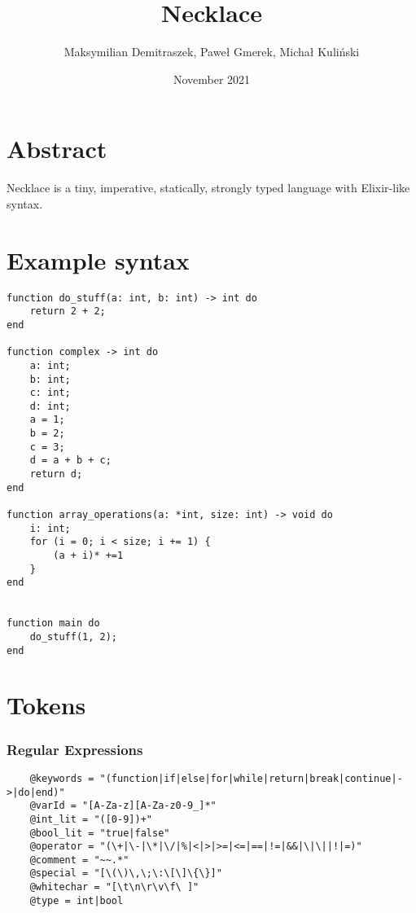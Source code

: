 \documentclass{article}
\title{Necklace}
\author{Maksymilian Demitraszek, Paweł Gmerek, Michał Kuliński}
\date{November 2021}
\begin{document}
\maketitle
\section{Abstract}
Necklace is a tiny, imperative, statically, strongly typed language with Elixir-like syntax.

\section{Example syntax}

\begin{verbatim}
function do_stuff(a: int, b: int) -> int do
    return 2 + 2;
end

function complex -> int do
    a: int;
    b: int;
    c: int;
    d: int;
    a = 1;
    b = 2;
    c = 3;
    d = a + b + c;
    return d;
end

function array_operations(a: *int, size: int) -> void do
    i: int;
    for (i = 0; i < size; i += 1) {
        (a + i)* +=1
    }
end


function main do
    do_stuff(1, 2);
end
\end{verbatim}

\section{Tokens}
\subsubsection{Regular Expressions}
\begin{verbatim}
    @keywords = "(function|if|else|for|while|return|break|continue|->|do|end)"
    @varId = "[A-Za-z][A-Za-z0-9_]*"
    @int_lit = "([0-9])+" 
    @bool_lit = "true|false"
    @operator = "(\+|\-|\*|\/|%|<|>|>=|<=|==|!=|&&|\|\||!|=)"
    @comment = "~~.*"
    @special = "[\(\)\,\;\:\[\]\{\}]"
    @whitechar = "[\t\n\r\v\f\ ]"
    @type = int|bool
\end{verbatim}
\end{document}
